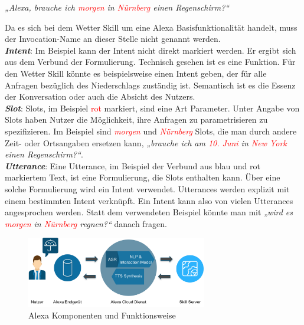 \begin{center} %
\textit{„Alexa, \textcolor{mybluelight}{brauche ich \textcolor{red}{morgen} in \textcolor{red}{Nürnberg} einen Regenschirm?“}}
\end{center}

Da es sich bei dem Wetter Skill um eine Alexa Basisfunktionalität handelt, muss der Invocation-Name an dieser Stelle nicht genannt werden.\\

\textbf{\textit{Intent}}: Im Beispiel kann der Intent nicht direkt markiert werden. Er ergibt sich aus dem Verbund der Formulierung. Technisch gesehen ist es eine Funktion. Für den Wetter Skill könnte es beispielsweise einen Intent geben, der für alle Anfragen bezüglich des Niederschlags zuständig ist. Semantisch ist es die Essenz der Konversation oder auch die Absicht des Nutzers.\\

\textbf{\textit{Slot}}: Slots, im Beispiel \textcolor{red}{rot} markiert, sind eine Art Parameter. Unter Angabe von Slots haben Nutzer die Möglichkeit, ihre Anfragen zu parametrisieren \bzw zu spezifizieren. Im Beispiel sind \textit{\textcolor{red}{morgen}} und \textit{\textcolor{red}{Nürnberg}} Slots, die man durch andere Zeit- oder Ortsangaben ersetzen kann, \zB \textit{\textcolor{mybluelight}{„brauche ich am \textcolor{red}{10. Juni} in \textcolor{red}{New York} einen Regenschirm?“}}.\\

\textbf{\textit{Utterance}}: Eine Utterance, im Beispiel der Verbund aus blau und rot markiertem Text, ist eine Formulierung, die Slots enthalten kann. Über eine solche Formulierung wird ein Intent verwendet. Utterances werden explizit mit einem bestimmten Intent verknüpft. Ein Intent kann also von vielen Utterances angesprochen werden. Statt dem verwendeten Beispiel könnte man mit \textit{\textcolor{mybluelight}{„wird es \textcolor{red}{morgen} in \textcolor{red}{Nürnberg} regnen?“}} danach fragen.

\begin{figure}[!htb]
    \centering
    \includegraphics[width=0.7\textwidth]{bilder/2_alexaDiagramDetail.png}
    \caption{Alexa Komponenten und Funktionsweise}
    \label{fig:alexa-komponenten-funktionsweise}
\end{figure}

